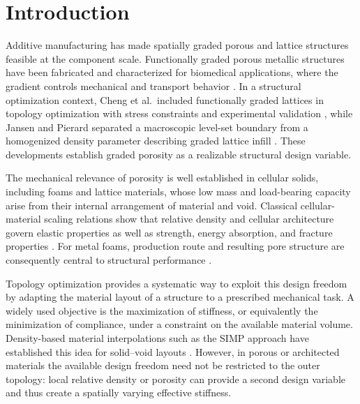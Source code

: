 \documentclass[
	pdflatex,
	sn-mathphys-num
]{sn-jnl}
\theoremstyle{thmstyleone}%
\theoremstyle{thmstyletwo}%
\theoremstyle{thmstylethree}%
\begin{document}

\maketitle

\section{Introduction}\label{sec_intro}
Additive manufacturing has made spatially graded porous and
lattice structures feasible at the component scale.
Functionally graded porous metallic structures have been
fabricated and characterized for biomedical applications, where
the gradient controls mechanical and transport behavior
\cite{li_additively_2019,hou_additive_2022}. In a structural
optimization context, Cheng et al.\ included functionally graded
lattices in topology optimization with stress constraints and
experimental validation \cite{cheng_functionally_2019}, while
Jansen and Pierard separated a macroscopic level-set boundary
from a homogenized density parameter describing graded lattice
infill \cite{jansen_hybrid_2020}. These developments establish
graded porosity as a realizable structural design variable.

The mechanical relevance of porosity is well established in
cellular solids, including foams and lattice materials, whose
low mass and load-bearing capacity arise from their internal
arrangement of material and void. Classical cellular-material
scaling relations show that relative density and cellular
architecture govern elastic properties as well as strength,
energy absorption, and fracture properties
\cite{gibson_mechanics_1982,gibson_cellular_1997}. For metal
foams, production route and resulting pore structure are
consequently central to structural performance
\cite{_metal_2000,BANHART2018347}.

Topology optimization provides a systematic way to exploit this
design freedom by adapting the material layout of a structure
to a prescribed mechanical task. A widely used objective is the
maximization of stiffness, or
equivalently the minimization of compliance, under a constraint
on the available material volume. Density-based material
interpolations such as the SIMP approach have established this
idea for solid--void layouts
\cite{bendsoe_optimal_1989}. However, in porous or architected
materials the available design freedom need not be
restricted to the outer topology: local relative density or
porosity can provide a second design variable and thus create a
spatially varying effective stiffness.
\end{document}
